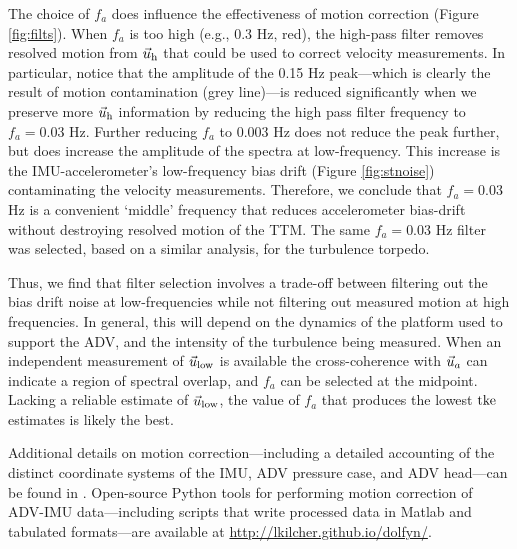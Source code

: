 The choice of $f_a$ does influence the effectiveness of motion correction (Figure \ref{fig:filts}). When $f_a$ is too high (e.g., 0.3  Hz, red), the high-pass filter removes resolved motion from $\uhead$ that could be used to correct velocity measurements. In particular, notice that the amplitude of the 0.15 Hz peak---which is clearly the result of motion contamination (grey line)---is reduced significantly when we preserve more $\uhead$ information by reducing the high pass filter frequency to $f_a = 0.03$ Hz. Further reducing $f_a$ to $0.003$ Hz does not reduce the peak further, but does increase the amplitude of the spectra at low-frequency. This increase is the IMU-accelerometer's low-frequency bias drift (Figure \ref{fig:stnoise}) contaminating the velocity measurements. Therefore, we conclude that $f_a = 0.03$ Hz is a convenient `middle' frequency that reduces accelerometer bias-drift without destroying resolved motion of the TTM.  The same $f_a=0.03$ Hz filter was selected, based on a similar analysis, for the turbulence torpedo. 

Thus, we find that filter selection involves a trade-off between filtering out the bias drift noise at low-frequencies while not filtering out measured motion at high frequencies. In general, this will depend on the dynamics of the platform used to support the ADV, and the intensity of the turbulence being measured. When an independent measurement of $\ulow$ is available the cross-coherence with $\uacc$ can indicate a region of spectral overlap, and $f_a$ can be selected at the midpoint. Lacking a reliable estimate of $\ulow$,  the value of $f_a$ that produces the lowest $\mathrm{tke}$ estimates is likely the best. 

Additional details on motion correction---including a detailed accounting of the distinct coordinate systems of the IMU, ADV pressure case, and ADV head---can be found in \cite{Kilcher++2016}. Open-source Python tools for performing motion correction of ADV-IMU data---including scripts that write processed data in Matlab and tabulated formats---are available at \url{http://lkilcher.github.io/dolfyn/}.

\def\ue{\ensuremath{\vec{u}\earth}}

